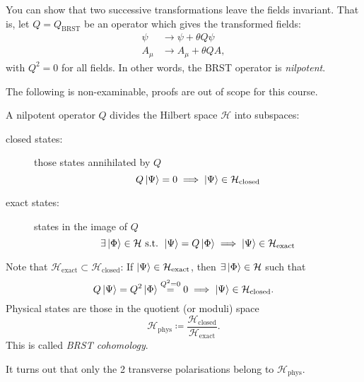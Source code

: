 You can show that two successive transformations leave the fields invariant. That is, let $Q = Q_{\text{BRST}}$ be an operator which gives the transformed fields:
\begin{align}
  \psi &\to \psi + \theta Q \psi \\
  A_{\mu} &\to A_{\mu} + \theta Q A,
\end{align}
with $Q^2  =0$ for all fields.
In other words, the BRST operator is \emph{nilpotent}.

\begin{leftbar}
  The following is non-examinable, proofs are out of scope for this course.
\end{leftbar}

A nilpotent operator $Q$ divides the Hilbert space $\mathcal{H}$ into subspaces:
\begin{description}
  \item[closed states:] those states annihilated by $Q$
    \begin{equation}
      Q \ket{\Psi} = 0 \implies \ket{\Psi} \in \mathcal{H}_{\text{closed}}
    \end{equation}
  \item[exact states:] states in the image of $Q$
    \begin{equation}
      \exists \ket{\Phi} \in \mathcal{H} \text{ s.t. } \ket{\Psi} = Q \ket{\Phi} \implies \ket{\Psi} \in \mathcal{H}_{\text{exact}}
    \end{equation}
\end{description}
Note that $\mathcal{H}_{\text{exact}} \subset \mathcal{H}_{\text{closed}}$: If $\ket{\Psi} \in \mathcal{H}_{\text{exact}}$, then $\exists \ket{\Phi} \in \mathcal{H}$ such that
\begin{equation}
  Q \ket{\Psi} = Q^2 \ket{\Phi} \stackrel{Q^2 = 0}{=} 0 \implies \ket{\Psi} \in \mathcal{H}_{\text{closed}}.
\end{equation}
Physical states are those in the quotient (or moduli) space
\begin{equation}
  \mathcal{H}_{\text{phys}} \coloneqq \frac{\mathcal{H}_{\text{closed}}}{\mathcal{H}_{\text{exact}}}.
\end{equation}
This is called \emph{BRST cohomology}.

It turns out that only the 2 transverse polarisations belong to $\mathcal{H}_{\text{phys}}$.

